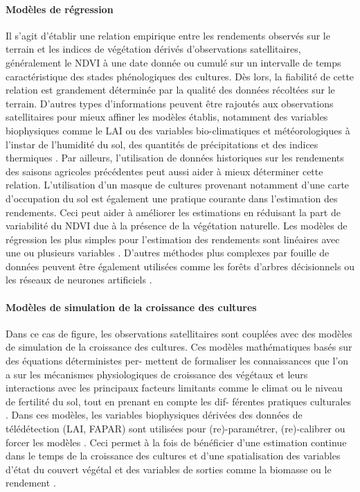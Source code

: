 \paragraph{Modèles de régression} Il s’agit d’établir une relation empirique entre les rendements observés sur le terrain et les indices de végétation dérivés d’observations satellitaires, généralement le NDVI à une date donnée ou cumulé sur un intervalle de
temps caractéristique des stades phénologiques des cultures. Dès lors, la fiabilité de
cette relation est grandement déterminée par la qualité des données récoltées sur le
terrain. D’autres types d’informations peuvent être rajoutés aux observations satellitaires pour mieux affiner les modèles établis, notamment des variables biophysiques
comme le LAI ou des variables bio-climatiques et météorologiques à l’instar de l’humidité du sol, des quantités de précipitations et des indices thermiques \citep{Leroux2016}. Par ailleurs, l’utilisation de données historiques sur les rendements des saisons
agricoles précédentes peut aussi aider à mieux déterminer cette relation. L’utilisation d’un masque de cultures provenant notamment d’une carte d’occupation du sol est
également une pratique courante dans l’estimation des rendements. Ceci peut aider
à améliorer les estimations en réduisant la part de variabilité du NDVI due à la présence de la végétation naturelle. Les modèles de régression les plus simples pour
l’estimation des rendements sont linéaires avec une ou plusieurs variables \citep{Johnson2014,Lambert2018}. D’autres méthodes plus complexes par fouille de données peuvent être également utilisées comme les forêts d’arbres décisionnels ou les réseaux de neurones artificiels \citep{Fieuzal2017}.

\paragraph{Modèles de simulation de la croissance des cultures} Dans ce cas de figure, les observations satellitaires sont couplées avec des modèles de simulation de la croissance
des cultures. Ces modèles mathématiques basés sur des équations déterministes per-
mettent de formaliser les connaissances que l’on a sur les mécanismes physiologiques
de croissance des végétaux et leurs interactions avec les principaux facteurs limitants
comme le climat ou le niveau de fertilité du sol, tout en prenant en compte les dif-
férentes pratiques culturales \citep{Delecolle1992}. Dans ces modèles, les variables biophysiques dérivées des données de télédétection (LAI, FAPAR) sont utilisées pour
(re)-paramétrer, (re)-calibrer ou forcer les modèles \citep{Jin2018}. Ceci permet à
la fois de bénéficier d’une estimation continue dans le temps de la croissance des
cultures et d’une spatialisation des variables d’état du couvert végétal et des variables de sorties comme la biomasse ou le rendement \citep{Rembold2013}.

